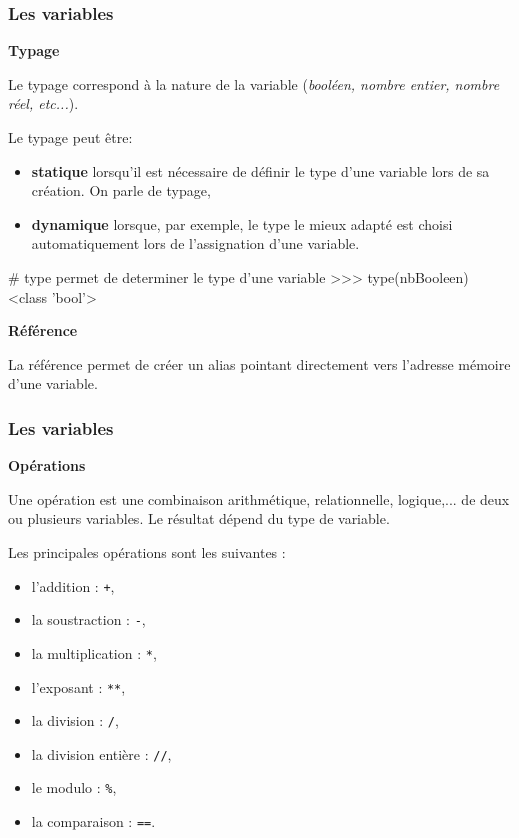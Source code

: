 \begin{frame}[fragile]
\frametitle{Les variables}

\textbf{Typage}

Le typage correspond à la nature de la variable (\textit{booléen, nombre entier, nombre réel, etc...}).

Le typage peut être:
\begin{itemize}
 \item \textbf{statique} lorsqu'il est nécessaire de définir le type d'une variable lors de sa création. On parle
de typage,
 \item \textbf{dynamique} lorsque, par exemple, le type le mieux adapté est choisi automatiquement lors de l'assignation
d'une variable.
\end{itemize}

\begin{GrayBox}[0.75\textwidth]
\begin{verbatimtab}[3]
# type permet de determiner le type d'une variable
>>> type(nbBooleen)
	<class 'bool'>
\end{verbatimtab}
\end{GrayBox}

\vspace{-0.2cm}

\textbf{Référence}

La référence permet de créer un alias pointant directement vers l'adresse mémoire d'une variable.

\end{frame}

\begin{frame}[fragile]
\frametitle{Les variables}

\textbf{Opérations}

Une opération est une combinaison arithmétique, relationnelle, logique,... de deux ou plusieurs variables. Le résultat dépend du type de variable.

Les principales opérations sont les suivantes :
\begin{itemize}
 \item l'addition : \verb|+|,
 \item la soustraction : \verb|-|,
 \item la multiplication : \verb|*|,
 \item l'exposant : \verb|**|,
 \item la division : \verb|/|,
 \item la division entière : \verb|//|,
 \item le modulo : \verb|%|,
 \item la comparaison : \verb|==|.
\end{itemize}

\end{frame}


